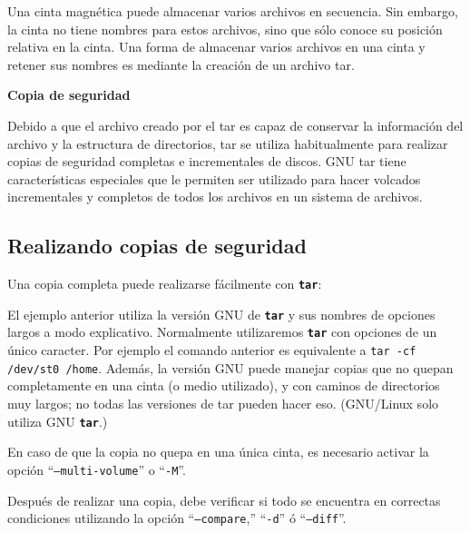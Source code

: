 \documentclass[12pt]{article}
\begin{document}
Una cinta magnética puede almacenar varios archivos en secuencia. Sin
 embargo, la cinta no tiene nombres para estos archivos, sino que sólo 
conoce su posición relativa en la cinta. Una forma de almacenar varios 
archivos en una cinta y retener sus nombres es mediante la creación de un 
archivo tar. 

{\bf Copia de seguridad}

Debido a que el archivo creado por el tar es capaz de conservar la 
información del archivo y la estructura de directorios, tar se utiliza 
habitualmente para realizar copias de seguridad completas e incrementales 
de discos. GNU tar tiene características especiales que le permiten ser
utilizado para hacer volcados incrementales y completos de todos los 
archivos en un sistema de archivos.

\subsection*{Realizando copias de seguridad}
Una copia completa puede realizarse fácilmente con \texttt{\textbf{tar}}:


El ejemplo anterior utiliza la versión GNU de \texttt{\textbf{tar}} y sus 
nombres de opciones largos a modo explicativo. Normalmente utilizaremos 
\texttt{\textbf{tar}} con opciones de un único caracter. Por ejemplo el 
comando anterior es equivalente a {\tt tar -cf /dev/st0 /home}. 
Además, la versión GNU puede manejar copias que no quepan completamente 
en una cinta (o medio utilizado), y con caminos de
directorios muy largos; no todas las versiones de tar pueden hacer eso. 
(GNU/Linux solo utiliza GNU \texttt{\textbf{tar}}.)  

En caso de que la copia no quepa en una única cinta, es necesario activar la
 opción ``{\tt --multi-volume}'' o ``{\tt -M}''. 

Después de realizar una copia, debe verificar si todo se encuentra en 
correctas condiciones utilizando la opción ``{\tt --compare},'' ``{\tt -d}'' ó 
``{\tt --diff}''. 
\end{document}
